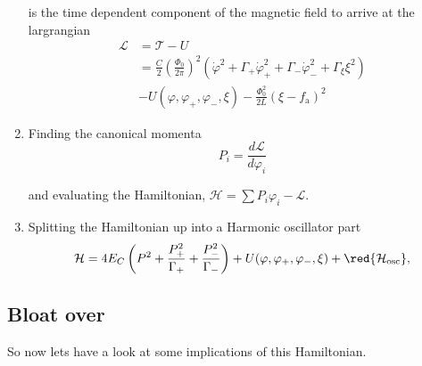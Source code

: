 \begin{enumerate}
  \noindent
  \noindent is  the time dependent  component of the magnetic  field to
  arrive at the largrangian
  \begin{equation}
    \begin{aligned}
      \mathcal{L} & = \mathcal{T} - U\\
      & =  \frac{C}{2}\left(\frac{\Phi_0}{2\pi}\right)^2\left(\dot{\varphi}^2 + \Gamma_+\dot{\varphi}_+^2 + \Gamma_-\dot{\varphi}_-^2 + \Gamma_\xi\xi^2\right)\\
      &     -     U(\varphi,     \varphi_+,     \varphi_-,     \xi)     -
      \frac{\Phi_0^2}{2L}\left(\xi - f_\text{a}\right)^2
    \end{aligned}
  \end{equation}
\item Finding the canonical momenta
  \begin{equation}
    P_i = \frac{d\mathcal{L}}{d\varphi_i}
  \end{equation}

  \noindent        and        evaluating        the        Hamiltonian,
  $ \mathcal{H} = \sum P_i\varphi_i - \mathcal{L} $.
\item Splitting the Hamiltonian up into a Harmonic oscillator part
  \begin{equation}
    \mathcal{H} = 4E_C\left(P^2 + \frac{P_+^2}{\Gamma_+} + \frac{P_-^2}{\Gamma_-}\right) + U(\varphi, \varphi_+, \varphi_-, \xi) + \red{\mathcal{H}_\text{osc}},
  \end{equation}

  \noindent {}
\end{enumerate}

\subsection{Bloat over}
So now lets have a look at some implications of this Hamiltonian.

